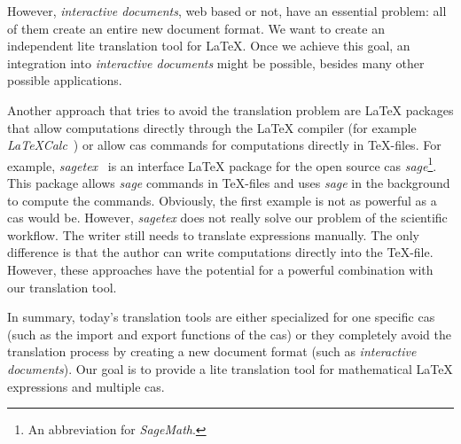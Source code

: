 However, \textit{interactive documents}, web based or not, have an essential problem: all of them create an entire new document format. We want to create an independent lite translation tool for \LaTeX. Once we achieve this goal, an integration into \textit{interactive documents} might be possible, besides many other possible applications.

Another approach that tries to avoid the translation problem are \LaTeX{} packages that allow computations directly through the \LaTeX{} compiler (for example \textit{LaTeXCalc}~\cite{LatexCalc}) or allow \gls{cas} commands for computations directly in \TeX -files. For example, \textit{sagetex}~\cite{Sagetex} is an interface \LaTeX{} package for the open source \gls{cas} \textit{sage}\footnote{An abbreviation for \textit{SageMath}.}. This package allows \textit{sage} commands in \TeX -files and uses \textit{sage} in the background to compute the commands. Obviously, the first example is not as powerful as a \gls{cas} would be. However, \textit{sagetex} does not really solve our problem of the scientific workflow. The writer still needs to translate expressions manually. The only difference is that the author can write computations directly into the \TeX -file. However, these approaches have the potential for a powerful combination with our translation tool.

In summary, today's translation tools are either specialized for one specific \gls{cas} (such as the import and export functions of the \gls{cas}) or they completely avoid the translation process by creating a new document format (such as \textit{interactive documents}). Our goal is to provide a lite translation tool for mathematical \LaTeX{} expressions and multiple \gls{cas}.